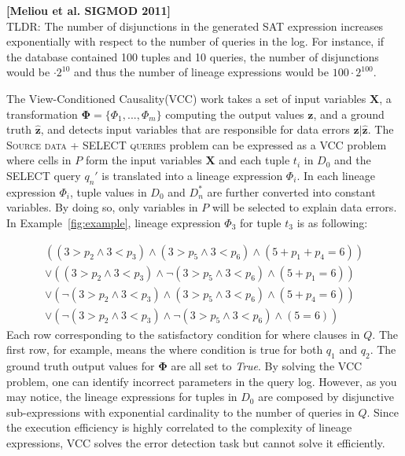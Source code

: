 \noindent \textbf{[Meliou et al. SIGMOD 2011]} \\
TLDR: The number of disjunctions in the generated SAT expression increases exponentially with respect to the number of queries in the log.  For instance, if the database contained 100 tuples and 10 queries, the number of disjunctions would be $\cdot 2^{10}$ and thus the number of lineage expressions would be $100\cdot 2^{100}$.

The View-Conditioned Causality(VCC) work takes a set of input variables $\mathbf{X}$, a transformation $\mathbf{\Phi} =\{\Phi_1, ... , \Phi_m\}$ computing the
output values $\mathbf{z}$, and a ground truth $\hat{\mathbf{z}}$, and detects input variables that are responsible for data errors $\mathbf{z}|\hat{\mathbf{z}}$. 
The \textsc{Source data + SELECT queries} problem can be expressed as a VCC problem where cells in $P$ form the input variables $\mathbf{X}$ and each tuple $t_i$ in $D_0$ and the SELECT query $q_n'$ is translated into a lineage expression $\Phi_i$. In each lineage expression $\Phi_i$, tuple values in $D_0$ and $D_n^*$ are further converted into constant variables. By doing so, only variables in $P$ will be selected to explain data errors. In Example~\ref{fig:example}, lineage expression $\Phi_3$ for tuple $t_3$ is as following:

{\small
\begin{eqnarray*}
&((3 > p_2 \wedge 3 < p_3) \wedge (3 > p_5 \wedge 3 < p_6) \wedge (5 + p_1+p_4 = 6)) &\\
&\vee ((3 > p_2 \wedge 3 < p_3) \wedge \neg(3 > p_5 \wedge 3 < p_6) \wedge (5 + p_1= 6))& \\
&\vee (\neg(3 > p_2 \wedge 3 < p_3) \wedge (3 > p_5 \wedge 3 < p_6) \wedge (5 + p_4= 6))& \\
&\vee (\neg(3 > p_2 \wedge 3 < p_3) \wedge \neg(3 > p_5 \wedge 3 < p_6) \wedge (5 = 6))&
\end{eqnarray*}
}
Each row corresponding to the satisfactory condition for where clauses in $Q$. The first row, for example, means the where condition is true for both $q_1$ and $q_2$. The ground truth output values for $\mathbf{\Phi}$ are all set to \textit{True}. By solving the VCC problem, one can identify incorrect parameters in the query log. However, as you may notice, the lineage expressions for tuples in $D_0$ are composed by disjunctive sub-expressions with exponential cardinality to the number of queries in $Q$. Since the execution efficiency is highly correlated to the complexity of lineage expressions, VCC solves the error detection task but cannot solve it efficiently. 

